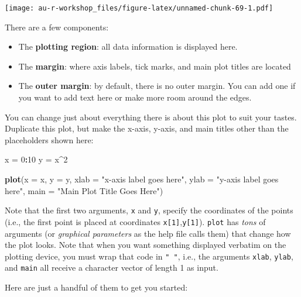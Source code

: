 \documentclass[]{book}
\newenvironment{Shaded}{\begin{snugshade}}{\end{snugshade}}
\newcommand{\KeywordTok}[1]{\textcolor[rgb]{0.13,0.29,0.53}{\textbf{#1}}}
\newcommand{\DataTypeTok}[1]{\textcolor[rgb]{0.13,0.29,0.53}{#1}}
\newcommand{\DecValTok}[1]{\textcolor[rgb]{0.00,0.00,0.81}{#1}}
\newcommand{\StringTok}[1]{\textcolor[rgb]{0.31,0.60,0.02}{#1}}
\newcommand{\OperatorTok}[1]{\textcolor[rgb]{0.81,0.36,0.00}{\textbf{#1}}}
\newcommand{\NormalTok}[1]{#1}
\providecommand{\tightlist}{%
  \setlength{\itemsep}{0pt}\setlength{\parskip}{0pt}}
\theoremstyle{definition}
\theoremstyle{definition}
\theoremstyle{definition}
\theoremstyle{remark}
\begin{document}
\texttt{[image: au-r-workshop\_files/figure-latex/unnamed-chunk-69-1.pdf]}

There are a few components:

\begin{itemize}
\tightlist
\item
  The \textbf{plotting region}: all data information is displayed here.
\item
  The \textbf{margin}: where axis labels, tick marks, and main plot
  titles are located
\item
  The \textbf{outer margin}: by default, there is no outer margin. You
  can add one if you want to add text here or make more room around the
  edges.
\end{itemize}

You can change just about everything there is about this plot to suit
your tastes. Duplicate this plot, but make the x-axis, y-axis, and main
titles other than the placeholders shown here:

\begin{Shaded}
\begin{Highlighting}[]
\NormalTok{x =}\StringTok{ }\DecValTok{0}\OperatorTok{:}\DecValTok{10}
\NormalTok{y =}\StringTok{ }\NormalTok{x}\OperatorTok{^}\DecValTok{2}

\KeywordTok{plot}\NormalTok{(}\DataTypeTok{x =}\NormalTok{ x, }\DataTypeTok{y =}\NormalTok{ y,}
     \DataTypeTok{xlab =} \StringTok{"x-axis label goes here"}\NormalTok{, }
     \DataTypeTok{ylab =} \StringTok{"y-axis label goes here"}\NormalTok{,}
     \DataTypeTok{main =} \StringTok{"Main Plot Title Goes Here"}\NormalTok{)}
\end{Highlighting}
\end{Shaded}

Note that the first two arguments, \texttt{x} and \texttt{y}, specify
the coordinates of the points (i.e., the first point is placed at
coordinates \texttt{x{[}1{]}},\texttt{y{[}1{]}}). \texttt{plot} has
\emph{tons} of arguments (or \emph{graphical parameters} as the help
file calls them) that change how the plot looks. Note that when you want
something displayed verbatim on the plotting device, you must wrap that
code in \texttt{"\ "}, i.e., the arguments \texttt{xlab}, \texttt{ylab},
and \texttt{main} all receive a character vector of length 1 as input.

Here are just a handful of them to get you started:
\end{document}
